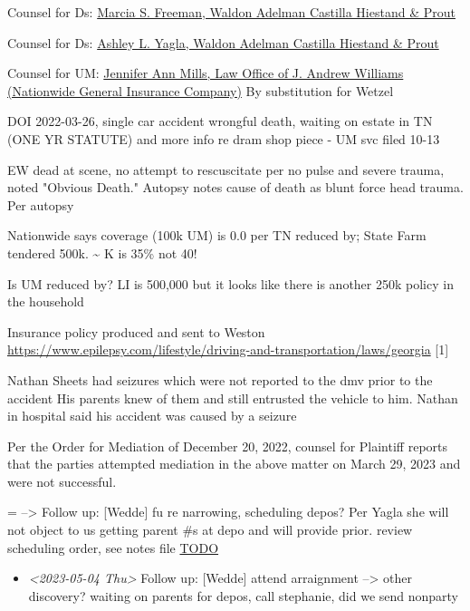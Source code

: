 \documentclass[11pt]{article}
\begin{document}
Counsel for Ds: \href{https://www.gabar.org/MemberSearchDetail.cfm?ID=NDMwOTIz}{Marcia S. Freeman, Waldon Adelman Castilla Hiestand \& Prout}

Counsel for Ds: \href{https://www.gabar.org/MemberSearchDetail.cfm?ID=MjM4ODQz}{Ashley L. Yagla, Waldon Adelman Castilla Hiestand \& Prout}

Counsel for UM: \href{https://gabar.org/MemberSearchDetail.cfm?ID=MTQyNTUz}{Jennifer Ann Mills, Law Office of J. Andrew Williams (Nationwide General Insurance Company)} By substitution for Wetzel

DOI 2022-03-26, single car accident wrongful death, waiting on estate in TN (ONE YR STATUTE) and more info re dram shop piece - UM svc filed 10-13

EW dead at scene, no attempt to rescuscitate per no pulse and severe trauma, noted "Obvious Death." Autopsy notes cause of death as blunt force head trauma. Per autopsy

Nationwide says coverage (100k UM) is 0.0 per TN reduced by; State Farm tendered 500k.
\textasciitilde{}
K is 35\% not 40!

Is UM reduced by? LI is 500,000 but it looks like there is another 250k policy in the household

Insurance policy produced and sent to Weston
 \url{https://www.epilepsy.com/lifestyle/driving-and-transportation/laws/georgia} [1]

Nathan Sheets had seizures which were not reported to the dmv prior to the accident
His parents knew of them and still entrusted the vehicle to him.
Nathan in hospital said his accident was caused by a seizure

Per the Order for Mediation of December 20, 2022, counsel for Plaintiff reports that the parties attempted mediation in the above matter on March 29, 2023 and were not successful.

=
--> Follow up: [Wedde] fu re narrowing, scheduling depos? Per Yagla she will not object to us getting parent \#s at depo and will provide prior. review scheduling order, see notes file \href{file:///Users/pmenair/Documents/WORK SYNC/projects/5-CaseFiles/Wedde.org}{TODO}

\begin{itemize}
\item \textit{<2023-05-04 Thu> } Follow up: [Wedde] attend arraignment --> other discovery? waiting on parents for depos, call stephanie, did we send nonparty
\end{itemize}
\end{document}
